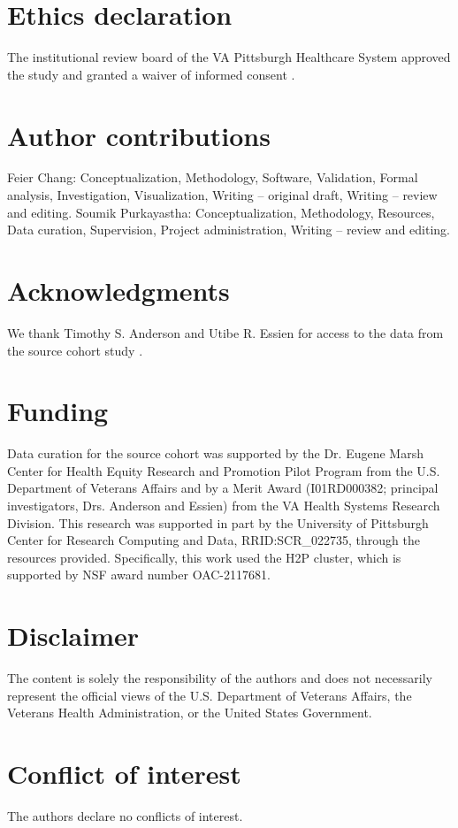 \documentclass[12pt]{article}
\theoremstyle{remark}
\begin{document}
\section*{Ethics declaration}
The institutional review board of the VA Pittsburgh Healthcare System approved the
study and granted a waiver of informed consent \citep{anderson2026initiation}.

\section*{Author contributions}
Feier Chang: Conceptualization, Methodology, Software, Validation, Formal
analysis, Investigation, Visualization, Writing -- original draft, Writing --
review and editing. Soumik Purkayastha: Conceptualization, Methodology,
Resources, Data curation, Supervision, Project administration, Writing -- review
and editing.

\section*{Acknowledgments}
We thank Timothy S. Anderson and Utibe R. Essien for access to the data from
the source cohort study \citep{anderson2026initiation}.

\section*{Funding}
Data curation for the source cohort was supported by the Dr. Eugene Marsh Center
for Health Equity Research and Promotion Pilot Program from the U.S. Department
of Veterans Affairs and by a Merit Award (I01RD000382; principal investigators,
Drs. Anderson and Essien) from the VA Health Systems Research Division. This
research was supported in part by the University of Pittsburgh Center for
Research Computing and Data, RRID:SCR\_022735, through the resources provided.
Specifically, this work used the H2P cluster, which is supported by NSF award
number OAC-2117681.

\section*{Disclaimer}
The content is solely the responsibility of the authors and does not necessarily
represent the official views of the U.S. Department of Veterans Affairs, the
Veterans Health Administration, or the United States Government.

\section*{Conflict of interest}
The authors declare no conflicts of interest.
\end{document}
